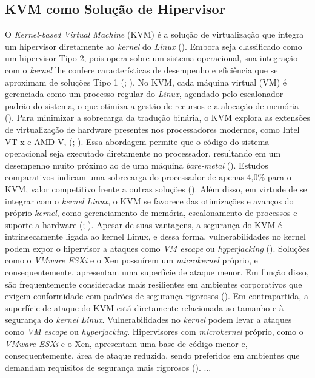 \begin{itemize}
\subsection{KVM como Solução de Hipervisor}

O \textit{Kernel-based Virtual Machine} (KVM) é a solução de virtualização que integra um hipervisor diretamente ao \textit{kernel} do \textit{Linux} (\cite{carissimi2008}). Embora seja classificado como um hipervisor Tipo 2, pois opera sobre um sistema operacional, sua integração com o \textit{kernel} lhe confere características de desempenho e eficiência que se aproximam de soluções Tipo 1 (\cite{chawla2025}; \cite{kominos2017}). No KVM, cada máquina virtual (VM) é gerenciada como um processo regular do \textit{Linux}, agendado pelo escalonador padrão do sistema, o que otimiza a gestão de recursos e a alocação de memória (\cite{anand2013}).
Para minimizar a sobrecarga da tradução binária, o KVM explora as extensões de virtualização de hardware presentes nos processadores modernos, como Intel VT-x e AMD-V, (\cite{chawla2025}; \cite{carissimi2008}). Essa abordagem permite que o código do sistema operacional seja executado diretamente no processador, resultando em um desempenho muito próximo ao de uma máquina \textit{bare-metal} (\cite{kominos2017}). Estudos comparativos indicam uma sobrecarga do processador de apenas 4,0\% para o KVM, valor competitivo frente a outras soluções (\cite{chawla2025}). Além disso, em virtude de se integrar com o \textit{kernel} \textit{Linux}, o KVM se favorece das otimizações e avanços do próprio \textit{kernel}, como gerenciamento de memória, escalonamento de processos e suporte a hardware (\cite{anand2013}; \cite{arora2014}).
Apesar de suas vantagens, a segurança do KVM é intrinsecamente ligada ao kernel Linux, e dessa forma, vulnerabilidades no kernel podem expor o hipervisor a ataques como \textit{VM escape} ou \textit{hyperjacking} (\cite{chawla2025}). Soluções como o \textit{VMware ESXi} e o Xen possuírem um \textit{microkernel} próprio, e consequentemente, apresentam uma superfície de ataque menor. Em função disso, são frequentemente consideradas mais resilientes em ambientes corporativos que exigem conformidade com padrões de segurança rigorosos (\cite{chawla2025}).
Em contrapartida, a superfície de ataque do KVM está diretamente relacionada ao tamanho e à segurança do \textit{kernel} \textit{Linux}. Vulnerabilidades no \textit{kernel} podem levar a ataques como \textit{VM escape} ou \textit{hyperjacking}. Hipervisores com \textit{microkernel} próprio, como o \textit{VMware ESXi} e o Xen, apresentam uma base de código menor e, consequentemente, área de ataque reduzida, sendo preferidos em ambientes que demandam requisitos de segurança mais rigorosos (\cite{chawla2025}).
{{ ... }}

\end{itemize}
